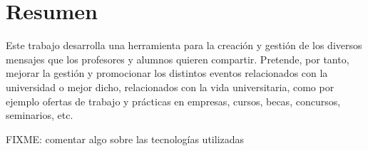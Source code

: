 
\chapter*{Resumen}

Este trabajo desarrolla una herramienta para la creación y gestión de los diversos mensajes que los profesores y alumnos quieren compartir. Pretende, por tanto, mejorar la gestión y promocionar los distintos eventos relacionados con la universidad o mejor dicho, relacionados con la vida universitaria, como por ejemplo ofertas de trabajo y prácticas en empresas, cursos, becas, concursos, seminarios, etc.

FIXME: comentar algo sobre las tecnologías utilizadas

